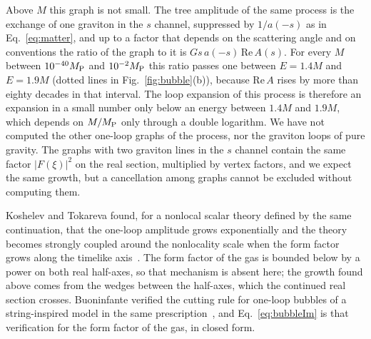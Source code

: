 \documentclass[aps,prd,10pt,twocolumn,superscriptaddress,nofootinbib,floatfix,longbibliography]{revtex4-2}
\begin{document}
Above $M$ this graph is not small. The tree amplitude of the same process is the exchange of one graviton in the $s$ channel, suppressed by $1/a(-s)$ as in Eq.~\eqref{eq:matter}, and up to a factor that depends on the scattering angle and on conventions the ratio of the graph to it is $Gs\,a(-s)\,\mathrm{Re}\,A(s)$. For every $M$ between $10^{-40}M_{\rm P}$ and $10^{-2}M_{\rm P}$ this ratio passes one between $E=1.4M$ and $E=1.9M$ (dotted lines in Fig.~\ref{fig:bubble}(b)), because $\mathrm{Re}\,A$ rises by more than eighty decades in that interval. The loop expansion of this process is therefore an expansion in a small number only below an energy between $1.4M$ and $1.9M$, which depends on $M/M_{\rm P}$ only through a double logarithm. We have not computed the other one-loop graphs of the process, nor the graviton loops of pure gravity. The graphs with two graviton lines in the $s$ channel contain the same factor $|F(\xi)|^2$ on the real section, multiplied by vertex factors, and we expect the same growth, but a cancellation among graphs cannot be excluded without computing them.

Koshelev and Tokareva found, for a nonlocal scalar theory defined by the same continuation, that the one-loop amplitude grows exponentially and the theory becomes strongly coupled around the nonlocality scale when the form factor grows along the timelike axis~\cite{KoshelevTokareva2021}. The form factor of the gas is bounded below by a power on both real half-axes, so that mechanism is absent here; the growth found above comes from the wedges between the half-axes, which the continued real section crosses. Buoninfante verified the cutting rule for one-loop bubbles of a string-inspired model in the same prescription~\cite{Buoninfante2022}, and Eq.~\eqref{eq:bubbleIm} is that verification for the form factor of the gas, in closed form.
\end{document}
